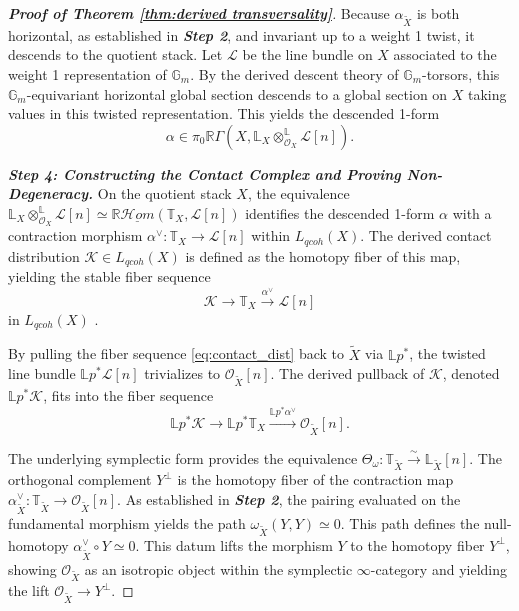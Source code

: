 \documentclass[reqno]{amsart}
\theoremstyle{definition}
\theoremstyle{remark}
\newcommand{\LL}{\mathbb{L}}
\newcommand{\TT}{\mathbb{T}}
\newcommand{\Gm}{\mathbb{G}_m}
\newcommand{\cO}{\mathcal{O}}
\newcommand{\cL}{\mathcal{L}}
\newcommand{\cK}{\mathcal{K}}
\begin{document}
{\begin{proof}[\textbf{Proof of Theorem \ref{thm:derived transversality}}]
  Because $\alpha_{\widetilde{X}}$ is both horizontal, as established in \textbf{\textit{Step 2}}, and invariant up to a weight 1 twist, it descends to the quotient stack. Let $\cL$ be the line bundle on $X$ associated to the weight 1 representation of $\Gm$. By the derived descent theory of $\Gm$-torsors, this $\Gm$-equivariant horizontal global section descends to a global section on $X$ taking values in this twisted representation. This yields the descended 1-form
  \begin{equation*}
    \alpha \in \pi_0 \mathbb{R}\Gamma(X, \LL_X \otimes^{\mathbb{L}}_{\cO_X} \cL[n]).
  \end{equation*}

\textbf{\textit{Step 4: Constructing the Contact Complex and Proving Non-Degeneracy.}}
  On the quotient stack $X$, the equivalence
  $\LL_X \otimes^{\mathbb{L}}_{\cO_X} \cL[n] \simeq
  \mathbb{R}\underline{\mathcal{H}om}(\TT_X, \cL[n])$ identifies
  the descended 1-form $\alpha$ with a contraction morphism
  $\alpha^\vee \colon \TT_X \to \cL[n]$
  within $L_{qcoh}(X)$. The derived contact distribution
  $\cK \in L_{qcoh}(X)$ is defined as the homotopy fiber of this map, yielding
  the stable fiber sequence 
  \begin{equation} \label{eq:contact_dist}
    \cK \to \TT_X \xrightarrow{\alpha^\vee} \cL[n]
  \end{equation}
  in $L_{qcoh}(X)$ \cite[Definition 3.5]{Berktav1}. 

  By pulling the fiber sequence \eqref{eq:contact_dist} back to
  $\widetilde{X}$ via $\mathbb{L}p^*$,
  the twisted line bundle $\mathbb{L}p^*\cL[n]$ trivializes to
  $\cO_{\widetilde{X}}[n]$.
  The derived pullback of $\cK$, denoted $\mathbb{L}p^*\cK$, fits
  into the fiber sequence
  \begin{equation*}
    \mathbb{L}p^*\cK \to \mathbb{L}p^*\TT_X
    \xrightarrow{\mathbb{L}p^*\alpha^\vee} \cO_{\widetilde{X}}[n].
  \end{equation*}

  The underlying symplectic form provides the equivalence
  $\Theta_\omega \colon \TT_{\widetilde{X}} \xrightarrow{\sim}
  \LL_{\widetilde{X}}[n]$. The orthogonal complement $Y^\perp$ is the
  homotopy fiber of the contraction map
  $\alpha_{\widetilde{X}}^\vee \colon \TT_{\widetilde{X}} \to
  \cO_{\widetilde{X}}[n]$. As established
  in \textbf{\textit{Step 2}}, the pairing evaluated on the fundamental morphism yields
  the path $\omega_{\widetilde{X}}(Y, Y) \simeq 0$. This path defines the
  null-homotopy $\alpha_{\widetilde{X}}^\vee \circ Y \simeq 0$. This datum lifts the morphism
  $Y$ to the homotopy fiber $Y^\perp$, showing $\cO_{\widetilde{X}}$
  as an isotropic object within the symplectic $\infty$-category and
  yielding the lift $\cO_{\widetilde{X}} \to Y^\perp$.


\end{proof}}
\end{document}
